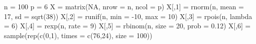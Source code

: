 \documentclass[
]{article}
\newenvironment{Shaded}{\begin{snugshade}}{\end{snugshade}}
\newcommand{\AttributeTok}[1]{\textcolor[rgb]{0.77,0.63,0.00}{#1}}
\newcommand{\ConstantTok}[1]{\textcolor[rgb]{0.00,0.00,0.00}{#1}}
\newcommand{\DecValTok}[1]{\textcolor[rgb]{0.00,0.00,0.81}{#1}}
\newcommand{\FloatTok}[1]{\textcolor[rgb]{0.00,0.00,0.81}{#1}}
\newcommand{\FunctionTok}[1]{\textcolor[rgb]{0.00,0.00,0.00}{#1}}
\newcommand{\NormalTok}[1]{#1}
\newcommand{\OtherTok}[1]{\textcolor[rgb]{0.56,0.35,0.01}{#1}}
\newcommand{\SpecialCharTok}[1]{\textcolor[rgb]{0.00,0.00,0.00}{#1}}
\begin{document}
\begin{Shaded}
\begin{Highlighting}[]
\NormalTok{n }\OtherTok{=} \DecValTok{100}
\NormalTok{p }\OtherTok{=} \DecValTok{6}
\NormalTok{X }\OtherTok{=} \FunctionTok{matrix}\NormalTok{(}\ConstantTok{NA}\NormalTok{, }\AttributeTok{nrow =}\NormalTok{ n, }\AttributeTok{ncol =}\NormalTok{ p)}
\NormalTok{X[,}\DecValTok{1}\NormalTok{] }\OtherTok{=} \FunctionTok{rnorm}\NormalTok{(n, }\AttributeTok{mean =} \DecValTok{17}\NormalTok{, }\AttributeTok{sd =} \FunctionTok{sqrt}\NormalTok{(}\DecValTok{38}\NormalTok{))}
\NormalTok{X[,}\DecValTok{2}\NormalTok{] }\OtherTok{=} \FunctionTok{runif}\NormalTok{(n, }\AttributeTok{min =} \SpecialCharTok{{-}}\DecValTok{10}\NormalTok{, }\AttributeTok{max =} \DecValTok{10}\NormalTok{)}
\NormalTok{X[,}\DecValTok{3}\NormalTok{] }\OtherTok{=} \FunctionTok{rpois}\NormalTok{(n, }\AttributeTok{lambda =} \DecValTok{6}\NormalTok{)}
\NormalTok{X[,}\DecValTok{4}\NormalTok{] }\OtherTok{=} \FunctionTok{rexp}\NormalTok{(n, }\AttributeTok{rate =} \DecValTok{9}\NormalTok{)}
\NormalTok{X[,}\DecValTok{5}\NormalTok{] }\OtherTok{=} \FunctionTok{rbinom}\NormalTok{(n, }\AttributeTok{size =} \DecValTok{20}\NormalTok{, }\AttributeTok{prob =} \FloatTok{0.12}\NormalTok{)}
\NormalTok{X[,}\DecValTok{6}\NormalTok{] }\OtherTok{=} \FunctionTok{sample}\NormalTok{(}\FunctionTok{rep}\NormalTok{(}\FunctionTok{c}\NormalTok{(}\DecValTok{0}\NormalTok{,}\DecValTok{1}\NormalTok{), }\AttributeTok{times =} \FunctionTok{c}\NormalTok{(}\DecValTok{76}\NormalTok{,}\DecValTok{24}\NormalTok{), }\AttributeTok{size =} \DecValTok{100}\NormalTok{))}


\end{Highlighting}
\end{Shaded}
\end{document}

